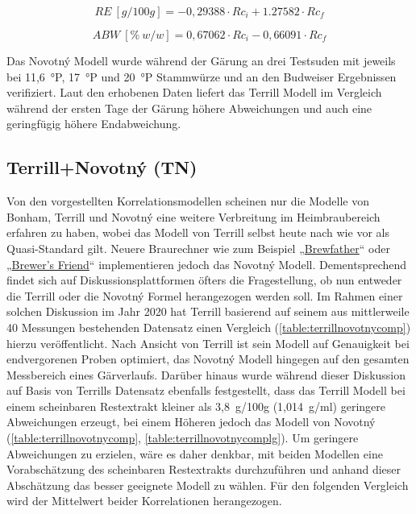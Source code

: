 \documentclass[a4paper,parskip=half]{scrartcl}
\newcommand{\bxic}{\mathit{Rc}_i}
\newcommand{\bxfc}{\mathit{Rc}_f}
\newcommand{\abw}{\mathit{ABW}}
\newcommand{\rex}{\mathit{RE}}
\begin{document}
\begin{equation}
\rex\:[g/100g] = -0,29388 \cdot \bxic + 1.27582 \cdot \bxfc
\label{eq:novotnyre}
\end{equation}

\begin{equation}
\abw\:[\%\:w/w] = 0,67062 \cdot \bxic - 0,66091 \cdot \bxfc
\label{eq:novotnyabw}
\end{equation}

Das Novotný Modell wurde während der Gärung an drei Testsuden mit jeweils
bei 11,6~°P, 17~°P und 20~°P Stammwürze und an den Budweiser
Ergebnissen verifiziert. Laut den erhobenen Daten liefert das Terrill
Modell im Vergleich während der ersten Tage der Gärung höhere
Abweichungen und auch eine geringfügig höhere Endabweichung.
\autocite{Novotny2017a,Novotny2017}

\subsection*{Terrill+Novotný (TN)}

Von den vorgestellten Korrelationsmodellen scheinen nur die
Modelle von Bonham, Terrill und Novotný eine weitere Verbreitung im Heimbraubereich erfahren zu haben, wobei das Modell von Terrill selbst
heute nach wie vor als Quasi-Standard gilt. Neuere Braurechner
wie zum Beispiel „\href{https://brewfather.app}{Brewfather}“
oder „\href{https://www.brewersfriend.com/refractometer-calculator}
{Brewer's Friend}“ implementieren jedoch das Novotný Modell.
Dementsprechend findet sich auf Diskussionsplattformen öfters die Fragestellung, ob nun
entweder die Terrill oder die Novotný Formel herangezogen werden
soll. Im Rahmen einer solchen Diskussion im Jahr 2020 hat Terrill
basierend auf seinem aus mittlerweile 40 Messungen bestehenden Datensatz
einen Vergleich (\autoref{table:terrillnovotnycomp}) hierzu veröffentlicht.
Nach Ansicht von Terrill ist sein Modell auf Genauigkeit bei endvergorenen
Proben optimiert, das Novotný Modell hingegen auf den gesamten
Messbereich eines Gärverlaufs. Darüber hinaus wurde während dieser Diskussion
auf Basis von Terrills Datensatz ebenfalls festgestellt, dass das
Terrill Modell bei einem scheinbaren Restextrakt kleiner als 3,8~g/100g 
(1,014~g/ml) geringere Abweichungen erzeugt, bei einem Höheren jedoch
das Modell von Novotný (\autoref{table:terrillnovotnycomp},
\autoref{table:terrillnovotnycomplg}). Um geringere Abweichungen zu
erzielen, wäre es
daher denkbar, mit beiden Modellen eine Vorabschätzung des scheinbaren Restextrakts durchzuführen und anhand dieser Abschätzung das besser
geeignete Modell zu wählen. Für den folgenden Vergleich wird der
Mittelwert beider Korrelationen herangezogen. \autocite{h22lude2020}
\end{document}
